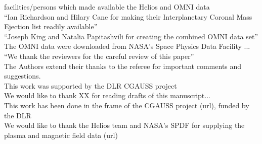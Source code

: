 facilities/persons which made available the Helios and OMNI data\\
``Ian Richardson and Hilary Cane for making their Interplanetary Coronal Mass Ejection list readily available''\\
``Joseph King and Natalia Papitashvili for creating the combined OMNI data set''\\
The OMNI data were downloaded from NASA's Space Physics Data Facility ...\\
``We thank the reviewers for the careful review of this paper''\\
The Authors extend their thanks to the referee for important comments and suggestions.\\
This work was supported by the DLR CGAUSS project\\
We would like to thank XX for reading drafts of this manuscript...\\
This work has been done in the frame of the CGAUSS project (url), funded by the DLR\\
We would like to thank the Helios team and NASA's SPDF for supplying the plasma and magnetic field data (url)\\

